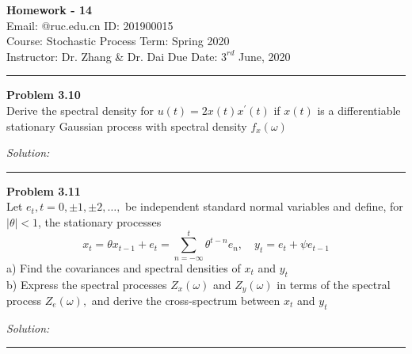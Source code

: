 \documentclass[a4paper, 11pt]{article}
\newenvironment{problem}[2][Problem]
    { \begin{mdframed}[backgroundcolor=gray!20] \textbf{#1 #2} \\}
    {  \end{mdframed}}
\newenvironment{solution}
    {\textit{Solution:}}
    {}
\begin{document}
\noindent
\large\textbf{} \hfill \textbf{Homework - 14}   \\
Email: @ruc.edu.cn \hfill ID: 201900015\\
\normalsize Course: Stochastic Process \hfill Term: Spring 2020\\
Instructor: Dr. Zhang \& Dr. Dai \hfill Due Date: $3^{rd}$ June, 2020 \\
\noindent\rule{7in}{2.8pt}
\begin{problem}{3.10}
Derive the spectral density for $u(t)=2 x(t) x^{\prime}(t)$ if $x(t)$ is a differentiable stationary Gaussian process with spectral density $f_{x}(\omega)$

\end{problem}
\begin{solution}



\end{solution} 
\noindent\rule{7in}{2.8pt}


\begin{problem}{3.11}
Let $e_{t}, t=0,\pm 1,\pm 2, \ldots,$ be independent standard normal variables and define, for $|\theta|<1$, the stationary processes
\[
x_{t}=\theta x_{t-1}+e_{t}=\sum_{n=-\infty}^{t} \theta^{t-n} e_{n}, \quad y_{t}=e_{t}+\psi e_{t-1}
\]
a) Find the covariances and spectral densities of $x_{t}$ and $y_{t}$\\
b) Express the spectral processes $Z_{x}(\omega)$ and $Z_{y}(\omega)$ in terms of the spectral process $Z_{e}(\omega),$ and derive the cross-spectrum between $x_{t}$ and $y_{t}$

\end{problem}
\begin{solution}


\end{solution} 
%
\noindent\rule{7in}{2.8pt}
\end{document}

